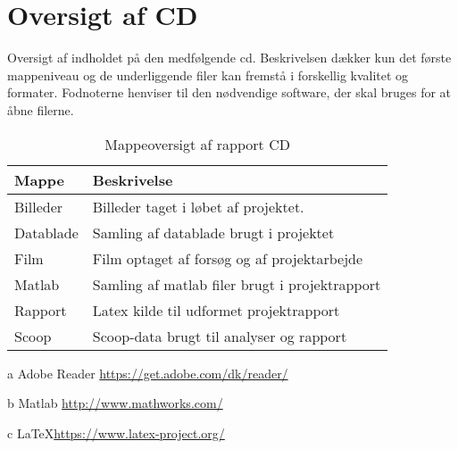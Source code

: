 \newpage
\section{Oversigt af CD}\label{bilag:cd}
Oversigt af indholdet på den medfølgende cd. Beskrivelsen dækker kun det første mappeniveau og de underliggende filer kan fremstå i forskellig kvalitet og formater. Fodnoterne henviser til den nødvendige software, der skal bruges for at åbne filerne.

\begin{table}[h!]
\centering
\caption{Mappeoversigt af rapport CD}
\label{tab:ordliste}
\begin{threeparttable}
\begin{tabular}{l l}
\toprule
\multicolumn{1}{l}{Mappe}       &
\multicolumn{1}{l}{Beskrivelse}  \\ 
\midrule
Billeder					& Billeder taget i løbet af projektet. \\
Datablade					& Samling af datablade brugt i projektet \tnote{a}\\
Film						& Film optaget af forsøg og af projektarbejde \\
Matlab						& Samling af matlab filer brugt i projektrapport\tnote{b} \\
Rapport						& Latex kilde til udformet projektrapport\tnote{c} \\
Scoop						& Scoop-data brugt til analyser og rapport \\
\bottomrule
\end{tabular}
\begin{tablenotes}
\item[a] Adobe Reader  \url{https://get.adobe.com/dk/reader/}
\item[b] Matlab \url{http://www.mathworks.com/}
\item[c] \LaTeX \url{https://www.latex-project.org/}
\end{tablenotes}
\end{threeparttable}
\end{table}
\label{LastPage}
